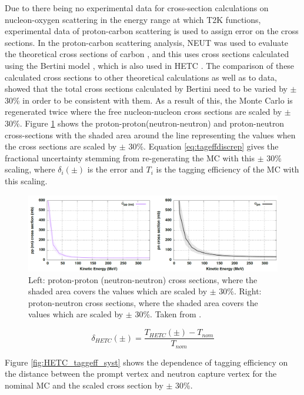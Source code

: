 Due to there being no experimental data for cross-section calculations on nucleon-oxygen scattering in the energy range at which T2K functions, experimental data of proton-carbon scattering is used to assign error on the cross sections. In the proton-carbon scattering analysis, NEUT was used to evaluate the theoretical cross sections of carbon \cite{hayato_neut}, and this uses cross sections calculated using the Bertini model \cite{bertini_hetc}, which is also used in HETC \cite{hetc_paper}. The comparison of these calculated cross sections to other theoretical calculations as well as to data, showed that the total cross sections calculated by Bertini need to be varied by $\pm$ 30\% in order to be consistent with them. As a result of this, the Monte Carlo is regenerated twice where the free nucleon-nucleon cross sections are scaled by $\pm$ 30\%. Figure \ref{fig:pp_nn_xsec} shows the proton-proton(neutron-neutron) and proton-neutron cross-sections with the shaded area around the line representing the values when the cross sections are scaled by $\pm$ 30\%. Equation \ref{eq:tageffdiscrep} gives the fractional uncertainty stemming from re-generating the MC with this $\pm$ 30\% scaling, where $\delta_{i}(\pm)$ is the error and $T_{i}$ is the tagging efficiency of the MC with this scaling.


\begin{figure}[!htb]
\centering
    \includegraphics[width=\textwidth]{Figures/pp_nn_xsec.PNG}
\caption{Left: proton-proton (neutron-neutron) cross sections, where the shaded area covers the values which are scaled by $\pm$ 30\%. Right: proton-neutron cross sections, where the shaded area covers the values which are scaled by $\pm$ 30\%. Taken from \cite{tn415_fiacob}.}
\label{fig:pp_nn_xsec}
\end{figure}



\begin{equation}
    \delta_{HETC }(\pm)=\frac{T_{HETC}(\pm)-T_{nom }}{T_{nom }}
\label{eq:HETC_uncertainty}
\end{equation}

Figure \ref{fig:HETC_taggeff_syst} shows the dependence of tagging efficiency on the distance between the prompt vertex and neutron capture vertex for the nominal MC and the scaled cross section by $\pm$ 30\%. 



